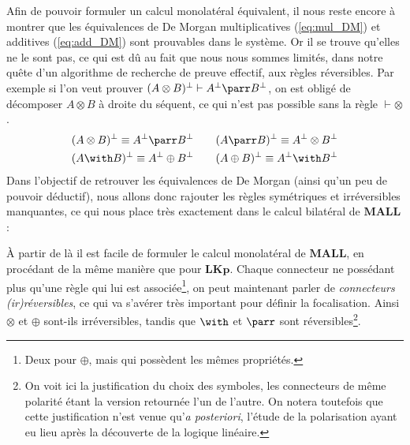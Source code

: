 \documentclass[12pt]{report}
\newcommand{\seq}{\vdash}
\newcommand{\irule}[1]{\footnotesize$#1$}
\newcommand{\iruleL}[1]{\irule{{#1}\seq}}
\newcommand{\iruleR}[1]{\irule{\seq{#1}}}
\begin{document}
Afin de pouvoir formuler un calcul monolatéral équivalent, il nous reste encore à montrer que les équivalences de De Morgan multiplicatives (\ref{eq:mul_DM}) et additives (\ref{eq:add_DM}) sont prouvables dans le système. Or il se trouve qu'elles ne le sont pas, ce qui est dû au fait que nous nous sommes limités, dans notre quête d'un algorithme de recherche de preuve effectif, aux règles réversibles. Par exemple si l'on veut prouver $(A \otimes B)^\bot \seq A^\bot \parr B^\bot$, on est obligé de décomposer $A \otimes B$ à droite du séquent, ce qui n'est pas possible sans la règle {\iruleR{\otimes}}.
\begin{align}
    (A \otimes B)^\bot \equiv A^\bot \parr B^\bot &\qquad (A \parr B)^\bot \equiv A^\bot \otimes B^\bot \label{eq:mul_DM} \\
    (A \with B)^\bot \equiv A^\bot \oplus B^\bot &\qquad (A \oplus B)^\bot \equiv A^\bot \with B^\bot \label{eq:add_DM}
\end{align}
Dans l'objectif de retrouver les équivalences de De Morgan (ainsi qu'un peu de pouvoir déductif), nous allons donc rajouter les règles symétriques et irréversibles manquantes, ce qui nous place très exactement dans le calcul bilatéral de $\mathbf{MALL}$ :

\begin{center}
\end{center}

À partir de là il est facile de formuler le calcul monolatéral de $\mathbf{MALL}$, en procédant de la même manière que pour $\mathbf{LKp}$. Chaque connecteur ne possédant plus qu'une règle qui lui est associée\footnote{Deux pour $\oplus$, mais qui possèdent les mêmes propriétés.}, on peut maintenant parler de \emph{connecteurs (ir)réversibles}, ce qui va s'avérer très important pour définir la focalisation. Ainsi $\otimes$ et $\oplus$ sont-ils irréversibles, tandis que $\with$ et $\parr$ sont réversibles\footnote{On voit ici la justification du choix des symboles, les connecteurs de même polarité étant la version retournée l'un de l'autre. On notera toutefois que cette justification n'est venue qu'\textit{a posteriori}, l'étude de la polarisation ayant eu lieu après la découverte de la logique linéaire.}.
\end{document}
